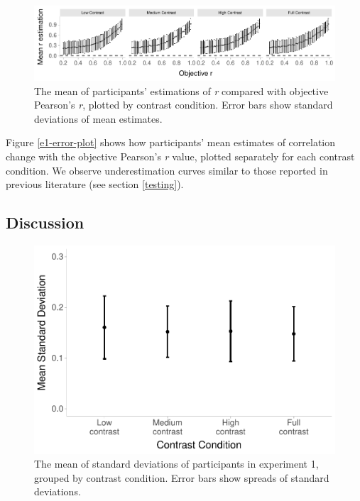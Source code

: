 \documentclass[preprint, 3p,
authoryear]{elsarticle} %
\begin{document}
\begin{figure}

{\centering \includegraphics{contrast_and_scatterplots_files/figure-latex/e1-error-plot-1} 

}

\caption{\label{e1-error-plot}The mean of participants' estimations of \textit{r} compared with objective Pearson's \textit{r}, plotted by contrast condition. Error bars show standard deviations of mean estimates.}\label{fig:e1-error-plot}
\end{figure}

Figure \ref{e1-error-plot} shows how participants' mean estimates of
correlation change with the objective Pearson's \emph{r} value, plotted
separately for each contrast condition. We observe underestimation
curves similar to those reported in previous literature (see section
\ref{testing}).

\hypertarget{discussion}{%
\subsection{Discussion}\label{discussion}}

\begin{figure}

\includegraphics[width=0.5\linewidth]{contrast_and_scatterplots_files/figure-latex/e1-sd-sd-plot-1} \hfill{}

\caption{\label{e1-sd-sd-plot}The mean of standard deviations of participants in experiment 1, grouped by contrast condition. Error bars show spreads of standard deviations.}\label{fig:e1-sd-sd-plot}
\end{figure}
\end{document}

